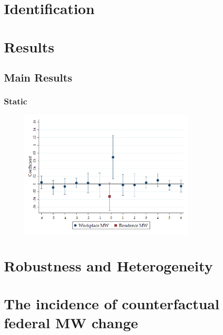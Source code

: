 \documentclass[aspectratio=169, t]{beamer}
\begin{document}
\section {Identification}

\section{Results}

\subsection{Main Results}

\begin{frame}
    \frametitle{Static }
    
\end{frame}

\begin{frame}
	\begin{figure}
		\centering
		\vspace{-2mm}
		\includegraphics[width=0.8\textwidth]{fd_baseline/output/fd_baseline_exp_ln_mw_17_dynamic.png}
	\end{figure}   
\end{frame}


\section{Robustness and Heterogeneity}

\section{The incidence of counterfactual federal MW change}
\end{document}
